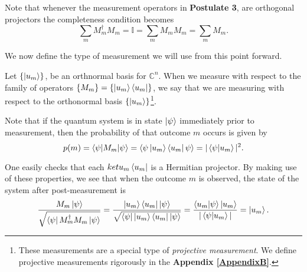 Note that whenever the measurement operators in \textbf{Postulate 3}, are orthogonal projectors the completeness condition becomes
\begin{equation}
\sum\limits_m M_m^\dagger M_m = \mathbb{I} = \sum\limits_m M_m M_m = \sum\limits_m M_m.
\end{equation}


We now define the type of measurement we will use from this point forward.  

\begin{definition} \label{def: measurement in a basis state vector}
Let $\{\ket{u_m}\}$, be an orthnormal basis for $\mathbb{C}^n$.  When we measure with respect to the family of operators $\{M_m\}=\{\ket{u_m}\bra{u_m}\}$, we say that we are measuring with respect to the orthonormal basis $\{\ket{u_m}\}$\footnote{These measurements are a special type of \textit{projective measurement}.  We define projective measurements rigorously in the \textbf{Appendix \ref{AppendixB}}.}.
\end{definition}
Note that if the quantum system is in state $\ket{\psi}$ immediately prior to measurement, then the probability of that outcome $m$ occurs is given by
\begin{equation}\label{eqn: basis measurement probability}
    p(m)=\braket{\psi|M_m|\psi}=\braket{\psi\ket{u_m}\bra{u_m}\psi}   =|\braket{\psi|u_m}|^2.
\end{equation}

One easily checks that each $ket{u_m}\bra{u_m}$ is a Hermitian projector.  By making use of these properties, we see that when the outcome $m$ is observed, the state of the system after post-measurement is
\begin{equation} 
\frac{M_m \ket{\psi}}{\sqrt{\bra{\psi}M_m^\dagger M_m \ket{\psi}}}=\frac{\ket{u_m}\bra{u_m} \ket{\psi}}{\sqrt{\bra{\psi}\ket{u_m}\bra{u_m} \ket{\psi}}}=\frac{\braket{u_m|\psi}\ket{u_m}}{|\braket{\psi|u_m}|}=\ket{u_m}.
\end{equation}



